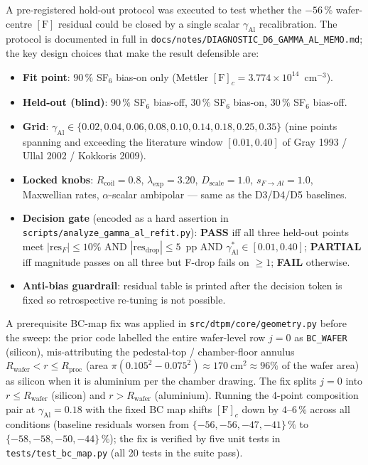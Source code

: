 \documentclass[11pt,a4paper]{report}
\begin{document}
A pre-registered hold-out protocol was executed to test whether the $-56\,\%$ wafer-centre $[\mathrm{F}]$ residual could be closed by a single scalar $\gamma_\mathrm{Al}$ recalibration.  The protocol is documented in full in \texttt{docs/notes/DIAGNOSTIC\_D6\_GAMMA\_AL\_MEMO.md}; the key design choices that make the result defensible are:
%
\begin{itemize}
  \item \textbf{Fit point}: $90\,\%$ SF$_6$ bias-on only (Mettler $[\mathrm{F}]_c = 3.774\times 10^{14}$~cm$^{-3}$).
  \item \textbf{Held-out (blind)}: $90\,\%$ SF$_6$ bias-off, $30\,\%$ SF$_6$ bias-on, $30\,\%$ SF$_6$ bias-off.
  \item \textbf{Grid}: $\gamma_\mathrm{Al} \in \{0.02, 0.04, 0.06, 0.08, 0.10, 0.14, 0.18, 0.25, 0.35\}$ (nine points spanning and exceeding the literature window $[0.01,0.40]$ of Gray 1993 / Ullal 2002 / Kokkoris 2009).
  \item \textbf{Locked knobs}: $R_\mathrm{coil}=0.8$, $\lambda_\mathrm{exp}=3.20$, $D_\mathrm{scale}=1.0$, $s_{F\rightarrow Al}=1.0$, Maxwellian rates, $\alpha$-scalar ambipolar --- same as the D3/D4/D5 baselines.
  \item \textbf{Decision gate} (encoded as a hard assertion in \texttt{scripts/analyze\_gamma\_al\_refit.py}): \textbf{PASS} iff all three held-out points meet $|\mathrm{res}_F|\leq 10\%$ AND $|\mathrm{res}_\mathrm{drop}|\leq 5$~pp AND $\gamma_\mathrm{Al}^{*}\in[0.01,0.40]$; \textbf{PARTIAL} iff magnitude passes on all three but F-drop fails on $\geq 1$; \textbf{FAIL} otherwise.
  \item \textbf{Anti-bias guardrail}: residual table is printed after the decision token is fixed so retrospective re-tuning is not possible.
\end{itemize}

A prerequisite BC-map fix was applied in \texttt{src/dtpm/core/geometry.py} before the sweep: the prior code labelled the entire wafer-level row $j=0$ as \texttt{BC\_WAFER} (silicon), mis-attributing the pedestal-top / chamber-floor annulus $R_\mathrm{wafer}<r\leq R_\mathrm{proc}$ (area $\pi(0.105^2-0.075^2)\approx 170~\mathrm{cm}^2 \approx 96\%$ of the wafer area) as silicon when it is aluminium per the chamber drawing.  The fix splits $j=0$ into $r\leq R_\mathrm{wafer}$ (silicon) and $r>R_\mathrm{wafer}$ (aluminium).  Running the 4-point composition pair at $\gamma_\mathrm{Al}=0.18$ with the fixed BC map shifts $[\mathrm{F}]_c$ down by $4$--$6\,\%$ across all conditions (baseline residuals worsen from $\{-56,-56,-47,-41\}\,\%$ to $\{-58,-58,-50,-44\}\,\%$); the fix is verified by five unit tests in \texttt{tests/test\_bc\_map.py} (all 20 tests in the suite pass).
\end{document}
